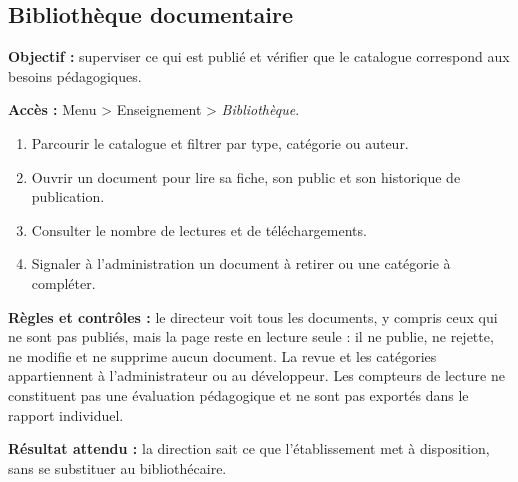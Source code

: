 \subsection{Bibliothèque documentaire}
\textbf{Objectif :} superviser ce qui est publié et vérifier que le catalogue correspond aux besoins
pédagogiques.\par
\textbf{Accès :} Menu > Enseignement > \emph{Bibliothèque}.\par
\begin{enumerate}
    \item Parcourir le catalogue et filtrer par type, catégorie ou auteur.
    \item Ouvrir un document pour lire sa fiche, son public et son historique de publication.
    \item Consulter le nombre de lectures et de téléchargements.
    \item Signaler à l'administration un document à retirer ou une catégorie à compléter.
\end{enumerate}
\textbf{Règles et contrôles :} le directeur voit tous les documents, y compris ceux qui ne sont pas
publiés, mais la page reste en lecture seule : il ne publie, ne rejette, ne modifie et ne supprime
aucun document. La revue et les catégories appartiennent à l'administrateur ou au développeur. Les
compteurs de lecture ne constituent pas une évaluation pédagogique et ne sont pas exportés dans le
rapport individuel.\par
\textbf{Résultat attendu :} la direction sait ce que l'établissement met à disposition, sans se
substituer au bibliothécaire.

